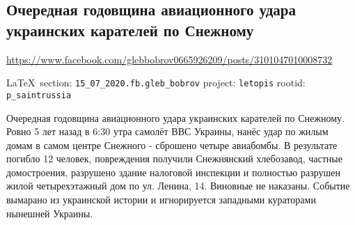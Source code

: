  
 
\subsection{Очередная годовщина авиационного удара украинских карателей по Снежному}
\label{sec:15_07_2020.fb.gleb_bobrov}
\url{https://www.facebook.com/glebbobrov0665926209/posts/3101047010008732}
  
\vspace{0.5cm}
{\small\LaTeX~section: \verb|15_07_2020.fb.gleb_bobrov| project: \verb|letopis| rootid: \verb|p_saintrussia|}
\vspace{0.5cm}

Очередная годовщина авиационного удара украинских карателей по Снежному. Ровно
5 лет назад в 6:30 утра самолёт ВВС Украины, нанёс удар по жилым домам в самом
центре Снежного - сброшено четыре авиабомбы. В результате погибло 12 человек,
повреждения получили Снежнянский хлебозавод, частные домостроения, разрушено
здание налоговой инспекции и полностью разрушен жилой четырехэтажный дом по ул.
Ленина, 14. Виновные не наказаны. Событие вымарано из украинской истории и
игнорируется западными кураторами нынешней Украины.
  
